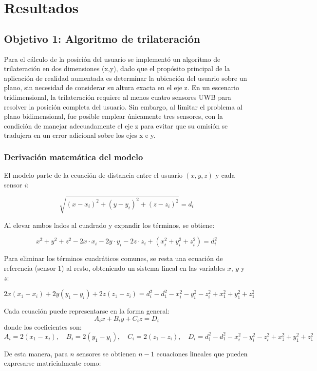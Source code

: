 \section{Resultados}
\subsection{Objetivo 1: Algoritmo de trilateración}

Para el cálculo de la posición del usuario se implementó un algoritmo de trilateración en dos dimensiones (x,y), dado que el propósito principal de la aplicación de realidad aumentada es determinar la ubicación del usuario sobre un plano, sin necesidad de considerar su altura exacta en el eje z. En un escenario tridimensional, la trilateración requiere al menos cuatro sensores UWB para resolver la posición completa del usuario. Sin embargo, al limitar el problema al plano bidimensional, fue posible emplear únicamente tres sensores, con la condición de manejar adecuadamente el eje z para evitar que su omisión se tradujera en un error adicional sobre los ejes x e y.

\subsubsection*{Derivación matemática del modelo}

El modelo parte de la ecuación de distancia entre el usuario $(x, y, z)$ y cada sensor $i$:

\[
\sqrt{(x-x_i)^2 + (y-y_i)^2 + (z-z_i)^2} = d_i
\]

Al elevar ambos lados al cuadrado y expandir los términos, se obtiene:

\[
x^2 + y^2 + z^2 - 2x \cdot x_i - 2y \cdot y_i - 2z \cdot z_i + (x_i^2 + y_i^2 + z_i^2) = d_i^2
\]

Para eliminar los términos cuadráticos comunes, se resta una ecuación de referencia (sensor 1) al resto, obteniendo un sistema lineal en las variables $x$, $y$ y $z$:

\[
2x(x_1 - x_i) + 2y(y_1 - y_i) + 2z(z_1 - z_i) = d_i^2 - d_1^2 - x_i^2 - y_i^2 - z_i^2 + x_1^2 + y_1^2 + z_1^2
\]

Cada ecuación puede representarse en la forma general:
\[
A_i x + B_i y + C_i z = D_i
\]
donde los coeficientes son:
\[
A_i = 2(x_1 - x_i), \quad
B_i = 2(y_1 - y_i), \quad
C_i = 2(z_1 - z_i), \quad
D_i = d_i^2 - d_1^2 - x_i^2 - y_i^2 - z_i^2 + x_1^2 + y_1^2 + z_1^2
\]

De esta manera, para $n$ sensores se obtienen $n-1$ ecuaciones lineales que pueden expresarse matricialmente como:


